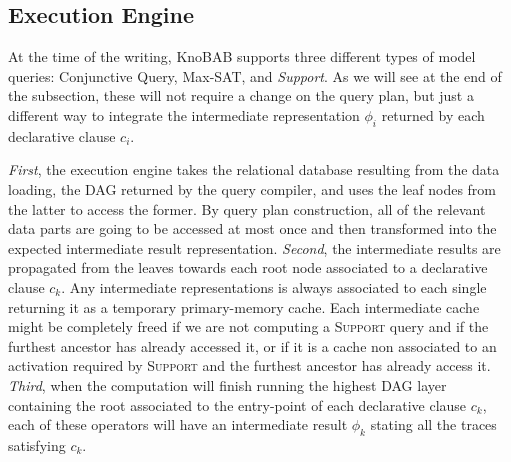 
\subsection{Execution Engine} \label{ssec:xltlf}
At the time of the writing, KnoBAB supports three different types of model queries: Conjunctive Query, Max-SAT, and \textit{Support}. As we will see at the end of the subsection, these will not require a change on the query plan, but just a different way to integrate the intermediate representation $\phi_i$ returned by each declarative clause $c_i$. 

\textit{First}, the execution engine takes the relational database resulting from the data loading, the DAG returned by the query compiler, and uses the leaf nodes from the latter to access the former. By query plan construction, all of the relevant data parts are going to be accessed at most once and then transformed into the expected intermediate result representation. \textit{Second}, the intermediate results are propagated from the leaves towards each root node associated to a declarative clause $c_k$. Any intermediate representations is always associated to each single returning it as a temporary primary-memory cache. Each intermediate cache  might be completely freed if we are not computing a  \textsc{Support} query and if the furthest ancestor has already accessed it, or if it is a cache non associated to an activation required by \textsc{Support} and the furthest ancestor has already access it. \textit{Third}, when the computation will finish running the highest DAG layer containing the \xLTLf root associated to the entry-point of each declarative clause $c_k$, each of these operators will have an intermediate result $\phi_k$ stating all the traces satisfying $c_k$.

